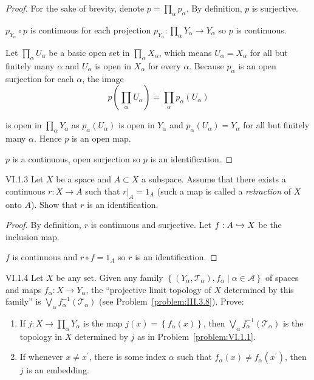 \begin{proof}
	For the sake of brevity, denote \( p = \prod_{\alpha} p_{\alpha} \). By definition, \( p \) is surjective.

	\( p_{Y_{\alpha}} \circ p \) is continuous for each projection \( p_{Y_{\alpha}}: \prod_{\alpha} Y_{\alpha} \to Y_{\alpha} \) so \( p \) is continuous.

	Let \( \prod_{\alpha} U_{\alpha} \) be a basic open set in \( \prod_{\alpha} X_{\alpha} \), which means \( U_{\alpha} = X_{\alpha} \) for all but finitely many \( \alpha \) and \( U_{\alpha} \) is open in \( X_{\alpha} \) for every \( \alpha \). Because \( p_{\alpha} \) is an open surjection for each \( \alpha \), the image
	\[
		p\left( \prod_{\alpha} U_{\alpha} \right) = \prod_{\alpha} p_{\alpha}(U_{\alpha})
	\]

	is open in \( \prod_{\alpha} Y_{\alpha} \) as \( p_{\alpha}(U_{\alpha}) \) is open in \( Y_{\alpha} \) and \( p_{\alpha}(U_{\alpha}) = Y_{\alpha} \) for all but finitely many \( \alpha \). Hence \( p \) is an open map.

	\( p \) is a continuous, open surjection so \( p \) is an identification.
\end{proof}

\begin{problem}{VI.1.3}
Let \( X \) be a space and \( A \subset X \) a subspace. Assume that there exists a continuous \( r: X \to A \) such that \( r\vert_{A} = 1_{A} \) (such a map is called a \textit{retraction} of \(X\) onto \(A\)). Show that \( r \) is an identification.
\end{problem}

\begin{proof}
	By definition, \( r \) is continuous and surjective. Let \( f: A \xhookrightarrow{} X \) be the inclusion map.

	\( f \) is continuous and \( r \circ f = 1_{A} \) so \( r \) is an identification.
\end{proof}

\begin{problem}{VI.1.4}
Let \( X \) be any set. Given any family \( \left\{ (Y_{\alpha}, \mathscr{T}_{\alpha}), f_{\alpha} \mid \alpha \in \mathscr{A} \right\} \) of spaces and maps \( f_{\alpha}: X \to Y_{\alpha} \), the ``projective limit topology of \(X\) determined by this family'' is \( \bigvee_{\alpha} f_{\alpha}^{-1}(\mathscr{T}_{\alpha}) \) (see Problem~\ref{problem:III.3.8}). Prove:
\begin{enumerate}[label={(\alph*)}]
	\item If \( j: X \to \prod_{\alpha} Y_{\alpha} \) is the map \( j(x) = \left\{ f_{\alpha}(x) \right\} \), then \( \bigvee_{\alpha} f_{\alpha}^{-1}(\mathscr{T}_{\alpha}) \) is the topology in \(X\) determined by \(j\) as in Problem~\ref{problem:VI.1.1}.
	\item If whenever \( x \ne x^{\prime} \), there is some index \( \alpha \) such that \( f_{\alpha}(x) \ne f_{\alpha}(x^{\prime}) \), then \( j \) is an embedding.
\end{enumerate}
\end{problem}

